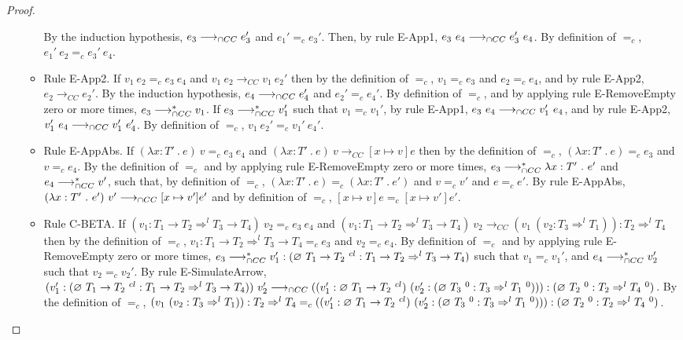 \documentclass[a4paper]{article}
\begin{document}
\begin{proof}
\begin{itemize}
\begin{itemize}
        By the induction hypothesis, $e_3 \longrightarrow_{\cap CC} e_3'$ and $e_1' =_c e_3'$.
        Then, by rule E-App1, $e_3\ e_4 \gios e_3'\ e_4$.
        By definition of $=_c$, $e_1'\ e_2 =_c e_3'\ e_4$.
        \item Rule E-App2.
        If $v_1\ e_2 =_c e_3\ e_4$ and $v_1\ e_2 \longrightarrow_{CC} v_1\ e_2'$ then by the definition of $=_c$, $v_1 =_c e_3$ and $e_2 =_c e_4$, and by rule E-App2, $e_2 \longrightarrow_{CC} e_2'$.
        By the induction hypothesis, $e_4 \longrightarrow_{\cap CC} e_4'$ and $e_2' =_c e_4'$.
        By definition of $=_c$, and by applying rule E-RemoveEmpty zero or more times, $e_3 \longrightarrow_{\cap CC}^* v_1$.
        If $e_3 \longrightarrow_{\cap CC}^* v_1'$ such that $v_1 =_c v_1'$, by rule E-App1, $e_3\ e_4 \gios v_1'\ e_4$, and by rule E-App2, $v_1'\ e_4 \longrightarrow_{\cap CC} v_1'\ e_4'$.
        By definition of $=_c$, $v_1\ e_2' =_c v_1'\ e_4'$.
        \item Rule E-AppAbs.
        If $(\lambda x : T'\ .\ e)\ v =_c e_3\ e_4$ and $(\lambda x : T'\ .\ e)\ v \longrightarrow_{CC} [x \mapsto v]e$ then by the definition of $=_c$, $(\lambda x : T'\ .\ e) =_c e_3$ and $v =_c e_4$.
        By the definition of $=_c$ and by applying rule E-RemoveEmpty zero or more times, $e_3 \longrightarrow_{\cap CC}^* \lambda x : T'\ .\ e'$ and $e_4 \longrightarrow_{\cap CC}^* v'$, such that, by definition of $=_c$, $(\lambda x : T'\ .\ e) = _c (\lambda x : T'\ .\ e')$ and $v =_c v'$ and $e =_c e'$.
        By rule E-AppAbs, $(\lambda x : T'\ .\ e')\ v' \longrightarrow_{\cap CC} [x \mapsto v']e'$ and by definition of $=_c$, $[x \mapsto v]e =_c [x \mapsto v']e'$.
        \item Rule C-BETA.
        If $(v_1 : T_1 \rightarrow T_2 \Rightarrow^l T_3 \rightarrow T_4)\ v_2 =_c e_3\ e_4$ and $(v_1 : T_1 \rightarrow T_2 \Rightarrow^l T_3 \rightarrow T_4)\ v_2 \longrightarrow_{CC} (v_1\ (v_2 : T_3 \Rightarrow^l T_1)) : T_2 \Rightarrow^l T_4$ then by the definition of $=_c$, $v_1 : T_1 \rightarrow T_2 \Rightarrow^l T_3 \rightarrow T_4 =_c e_3$ and $v_2 =_c e_4$.
        By definition of $=_c$ and by applying rule E-RemoveEmpty zero or more times, $e_3 \longrightarrow_{\cap CC}^* v_1' : (\varnothing\ T_1 \rightarrow T_2\ ^{cl} : T_1 \rightarrow T_2 \Rightarrow^l T_3 \rightarrow T_4)$ such that $v_1 =_c v_1'$, and $e_4 \longrightarrow_{\cap CC}^* v_2'$ such that $v_2 =_c v_2'$.
        By rule E-SimulateArrow, $(v_1' : (\varnothing\ T_1 \rightarrow T_2\ ^{cl} : T_1 \rightarrow T_2 \Rightarrow^l T_3 \rightarrow T_4))\ v_2' \longrightarrow_{\cap CC} ((v_1' : \varnothing\ T_1 \rightarrow T_2\ ^{cl})\ (v_2' : (\varnothing\ T_3\ ^{0} : T_3 \Rightarrow^l T_1\ ^0))) : (\varnothing\ T_2\ ^{0} : T_2 \Rightarrow^l T_4\ ^0)$.
        By the definition of $=_c$, $(v_1\ (v_2 : T_3 \Rightarrow^l T_1)) : T_2 \Rightarrow^l T_4 =_c ((v_1' : \emptycast{T_1 \rightarrow T_2}{cl})\ (v_2' : (\emptycast{T_3}{0} : T_3 \Rightarrow^l T_1\ ^0))) : (\emptycast{T_2}{0} : T_2 \Rightarrow^l T_4\ ^0)$.

\end{itemize}
\end{itemize}
\end{proof}
\end{document}
